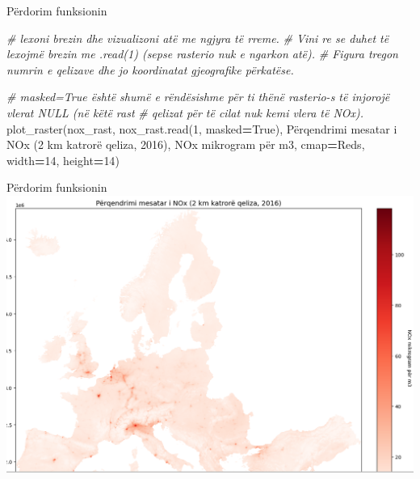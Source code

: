 \documentclass[
  ignorenonframetext,
]{beamer}
\newenvironment{Shaded}{\begin{snugshade}}{\end{snugshade}}
\newcommand{\CommentTok}[1]{\textcolor[rgb]{0.56,0.35,0.01}{\textit{#1}}}
\newcommand{\DecValTok}[1]{\textcolor[rgb]{0.00,0.00,0.81}{#1}}
\newcommand{\NormalTok}[1]{#1}
\newcommand{\OperatorTok}[1]{\textcolor[rgb]{0.81,0.36,0.00}{\textbf{#1}}}
\newcommand{\StringTok}[1]{\textcolor[rgb]{0.31,0.60,0.02}{#1}}
\newcommand{\VariableTok}[1]{\textcolor[rgb]{0.00,0.00,0.00}{#1}}
\begin{document}
\begin{frame}[fragile]{Përdorim funksionin}
\protect\hypertarget{puxebrdorim-funksionin}{}

\begin{Shaded}
\begin{Highlighting}[]
\CommentTok{\# lexoni brezin dhe vizualizoni atë me ngjyra të rreme.}
\CommentTok{\# Vini re se duhet të lexojmë brezin me .read(1) (sepse rasterio nuk e ngarkon atë).}
\CommentTok{\# Figura tregon numrin e qelizave dhe jo koordinatat gjeografike përkatëse.}

\CommentTok{\# masked=True është shumë e rëndësishme për t\textquotesingle{}i thënë rasterio{-}s të injorojë vlerat NULL (në këtë rast}
\CommentTok{\# qelizat për të cilat nuk kemi vlera të NOx).}
\NormalTok{plot\_raster(nox\_rast, nox\_rast.read(}\DecValTok{1}\NormalTok{, masked}\OperatorTok{=}\VariableTok{True}\NormalTok{), }
            \StringTok{\textquotesingle{}Përqendrimi mesatar i NOx (2 km katrorë qeliza, 2016)\textquotesingle{}}\NormalTok{, }
            \StringTok{\textquotesingle{}NOx mikrogram për m3\textquotesingle{}}\NormalTok{, cmap}\OperatorTok{=}\StringTok{\textquotesingle{}Reds\textquotesingle{}}\NormalTok{, width}\OperatorTok{=}\DecValTok{14}\NormalTok{, height}\OperatorTok{=}\DecValTok{14}\NormalTok{)}
\end{Highlighting}
\end{Shaded}
\end{frame}

\begin{frame}{Përdorim funksionin}
\protect\hypertarget{puxebrdorim-funksionin-1}{}
\includegraphics{./Figs/nox.png}
\end{frame}
\end{document}
